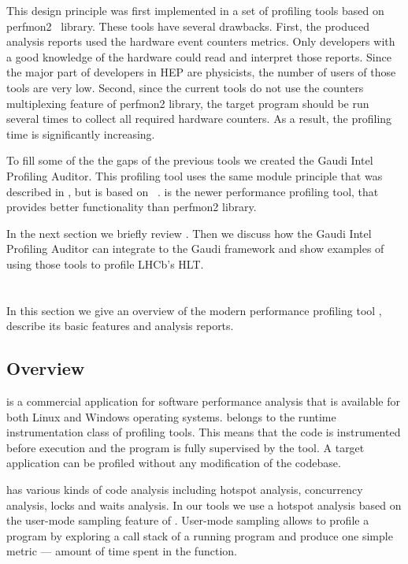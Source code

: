 \documentclass[a4paper]{jpconf}
\begin{document}
This design principle was first implemented in a set of profiling tools based on perfmon2~\cite{perfmon2} library.  
These tools have several drawbacks. First, the produced analysis reports  used the  hardware event counters metrics. 
Only developers with a good knowledge of the hardware could read and interpret those reports. Since the major part of 
developers in HEP are physicists, the number of users of those tools are very low. Second, since the current tools 
do not use the counters multiplexing feature of perfmon2 library, the target program should be run several times 
to collect all required hardware counters. As a result, the profiling time is significantly increasing.

To fill some of the the gaps of the previous tools we created the Gaudi Intel Profiling Auditor. This profiling tool 
uses the same module principle that was described in \cite{modular},  but is based on \iamp~\cite{vtune}. 
\amp is the newer performance profiling tool, that provides better functionality than perfmon2 library. 

In the next section we briefly review \iamp. Then we discuss how the Gaudi Intel Profiling Auditor can integrate \amp to 
the Gaudi framework and show examples of using those tools to profile LHCb's HLT.

\section{\iamp}
In this section we give an overview of the modern performance profiling tool \iamp, describe its basic features and analysis 
reports.

\subsection{Overview}
\iamp is a commercial application for software performance analysis that is available for both Linux and Windows 
operating systems. \amp belongs to the runtime instrumentation class of profiling tools. This means that the code is 
instrumented before execution and the program is fully supervised by the tool. A target application can be profiled without 
any modification of the codebase.

\iamp has  various kinds of code analysis including hotspot analysis, concurrency analysis, locks and waits analysis. 
In our tools we use a hotspot analysis based on the user-mode  sampling feature of \amp. User-mode sampling allows 
to profile a program by exploring a call stack of a running program and produce one simple metric --- amount of time 
spent in the function. 
\end{document}
